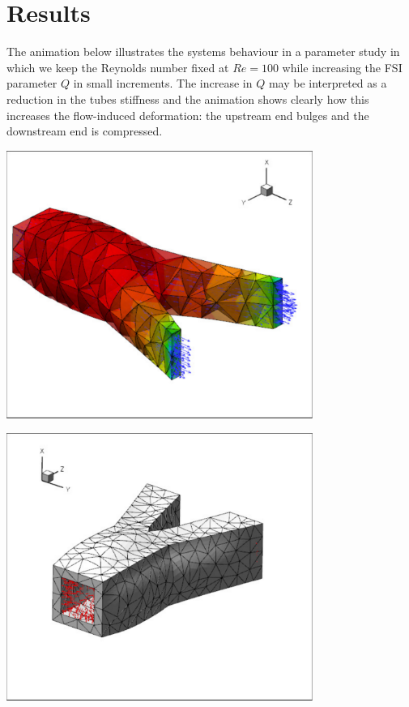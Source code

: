  

\hypertarget{index_results}{}\section{Results}\label{index_results}
The animation below illustrates the system\textquotesingle{}s behaviour in a parameter study in which we keep the Reynolds number fixed at $ Re=100 $ while increasing the F\+SI parameter $ Q $ in small increments. The increase in $ Q $ may be interpreted as a reduction in the tube\textquotesingle{}s stiffness and the animation shows clearly how this increases the flow-\/induced deformation\+: the upstream end bulges and the downstream end is compressed.

 
\begin{DoxyImage}
\includegraphics[width=0.75\textwidth]{unstructured_fluid}
\end{DoxyImage}


 
\begin{DoxyImage}
\includegraphics[width=0.75\textwidth]{unstructured_solid}
\end{DoxyImage}




